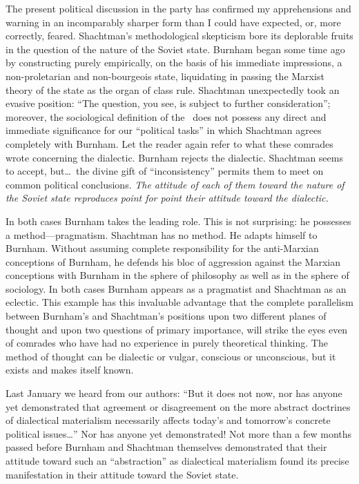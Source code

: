 The present political discussion in the party has confirmed my apprehensions and warning in an incomparably sharper form than I could have expected, or, more correctly, feared. Shachtman’s methodological skepticism bore its deplorable fruits in the question of the nature of the Soviet state. Burnham began some time ago by constructing purely empirically, on the basis of his immediate impressions, a non-proletarian and non-bourgeois state, liquidating in passing the Marxist theory of the state as the organ of class rule. Shachtman unexpectedly took an evasive position: “The question, you see, is subject to further consideration”; moreover, the sociological definition of the \USSR\ does not possess any direct and immediate significance for our “political tasks” in which Shachtman agrees completely with Burnham. Let the reader again refer to what these comrades wrote concerning the dialectic. Burnham rejects the dialectic. Shachtman seems to accept, but\dots\ the divine gift of “inconsistency” permits them to meet on common political conclusions. \emph{The attitude of each of them toward the nature of the Soviet state reproduces point for point their attitude toward the dialectic.}

In both cases Burnham takes the leading role. This is not surprising: he possesses a method---pragmatism. Shachtman has no method. He adapts himself to Burnham. Without assuming complete responsibility for the anti-Marxian conceptions of Burnham, he defends his bloc of aggression against the Marxian conceptions with Burnham in the sphere of philosophy as well as in the sphere of sociology. In both cases Burnham appears as a pragmatist and Shachtman as an eclectic. This example has this invaluable advantage that the complete parallelism between Burnham’s and Shachtman’s positions upon two different planes of thought and upon two questions of primary importance, will strike the eyes even of comrades who have had no experience in purely theoretical thinking. The method of thought can be dialectic or vulgar, conscious or unconscious, but it exists and makes itself known.

Last January we heard from our authors: “But it does not now, nor has anyone yet demonstrated that agreement or disagreement on the more abstract doctrines of dialectical materialism necessarily affects today’s and tomorrow’s concrete political issues\dots” Nor has anyone yet demonstrated! Not more than a few months passed before Burnham and Shachtman themselves demonstrated that their attitude toward such an “abstraction” as dialectical materialism found its precise manifestation in their attitude toward the Soviet state.

